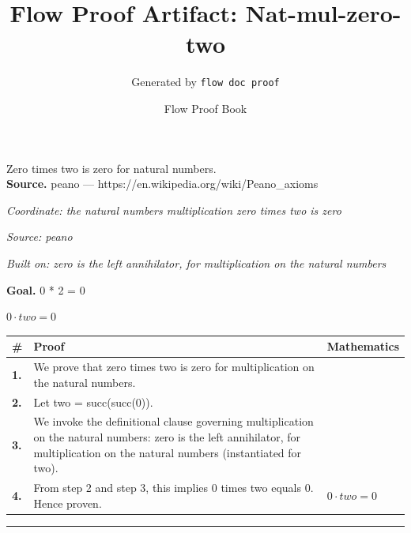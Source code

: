 \documentclass[11pt]{article}
\title{Flow Proof Artifact: Nat-mul-zero-two}
\author{Generated by \texttt{flow doc proof}}
\date{Flow Proof Book}
\theoremstyle{definition}
\begin{document}
\maketitle
Zero times two is zero for natural numbers.\\[0.5em]
\textbf{Source.} peano — https://en.wikipedia.org/wiki/Peano\_axioms\\[0.5em]
\bigskip
{}\par
\smallskip\noindent\textit{Coordinate: the natural numbers \cdot multiplication \cdot zero times two is zero}\par
\smallskip\noindent\textit{Source: peano}\par
\smallskip\noindent\textit{Built on: zero is the left annihilator, for multiplication on the natural numbers}\par
\medskip
\noindent\textbf{Goal.} 0 * 2 = 0\par
\noindent$\displaystyle 0 \cdot two = 0$\par
\medskip
\noindent
\begin{tabular}{@{} >{\raggedright\arraybackslash}p{} >{\raggedright\arraybackslash}p{} >{\raggedleft\arraybackslash}p{} @{}}
\textbf{\#} & \textbf{Proof} & \textbf{Mathematics} \\
\midrule
\textbf{1.} & We prove that zero times two is zero for multiplication on the natural numbers. & \\[0.45em]
\textbf{2.} & Let two = succ(succ(0)). & \\[0.45em]
\textbf{3.} & We invoke the definitional clause governing multiplication on the natural numbers: zero is the left annihilator, for multiplication on the natural numbers (instantiated for two). & \\[0.45em]
\textbf{4.} & From step 2 and step 3, this implies 0 times two equals 0. Hence proven. & $\displaystyle 0 \cdot two = 0$ \\[0.45em]
\bottomrule
\end{tabular}
\label{thm:Nat-multiplication-zero_times_two_is_zero}
\par\medskip\hrule
\end{document}
